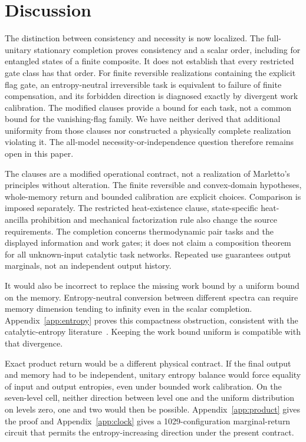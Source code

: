 \documentclass[11pt,a4paper]{article}
\begin{document}
\section{Discussion}
The distinction between consistency and necessity is now localized. The full-unitary stationary completion proves consistency and a scalar order, including for entangled states of a finite composite. It does not establish that every restricted gate class has that order. For finite reversible realizations containing the explicit flag gate, an entropy-neutral irreversible task is equivalent to failure of finite compensation, and its forbidden direction is diagnosed exactly by divergent work calibration. The modified clauses provide a bound for each task, not a common bound for the vanishing-flag family. We have neither derived that additional uniformity from those clauses nor constructed a physically complete realization violating it. The all-model necessity-or-independence question therefore remains open in this paper.

The clauses are a modified operational contract, not a realization of Marletto's principles without alteration. The finite reversible and convex-domain hypotheses, whole-memory return and bounded calibration are explicit choices. Comparison is imposed separately. The restricted heat-existence clause, state-specific heat-ancilla prohibition and mechanical factorization rule also change the source requirements. The completion concerns thermodynamic pair tasks and the displayed information and work gates; it does not claim a composition theorem for all unknown-input catalytic task networks. Repeated use guarantees output marginals, not an independent output history.

It would also be incorrect to replace the missing work bound by a uniform bound on the memory. Entropy-neutral conversion between different spectra can require memory dimension tending to infinity even in the scalar completion. Appendix~\ref{app:entropy} proves this compactness obstruction, consistent with the catalytic-entropy literature~\cite{boes,wilming21,wilming22}. Keeping the work bound uniform is compatible with that divergence.

Exact product return would be a different physical contract. If the final output and memory had to be independent, unitary entropy balance would force equality of input and output entropies, even under bounded work calibration. On the seven-level cell, neither direction between level one and the uniform distribution on levels zero, one and two would then be possible. Appendix~\ref{app:product} gives the proof and Appendix~\ref{app:clock} gives a 1029-configuration marginal-return circuit that permits the entropy-increasing direction under the present contract.
\end{document}
